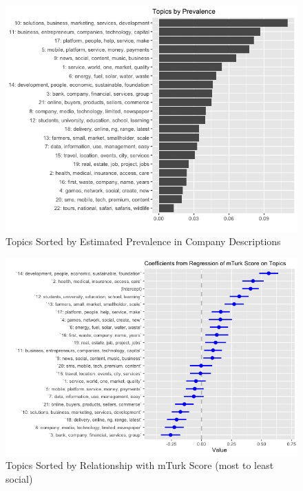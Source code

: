 \documentclass[12pt]{article}
\begin{document}
\begin{figure} [!htb]
\centering
\includegraphics[scale=0.5]{topic_prevalence}
\caption{Topics Sorted by Estimated Prevalence in Company Descriptions}
\end{figure}

\begin{figure} [!htb]
\centering
\includegraphics[scale=0.5]{topics_coefplot}
\caption{Topics Sorted by Relationship with mTurk Score (most to least social)}
\end{figure}
\end{document}
